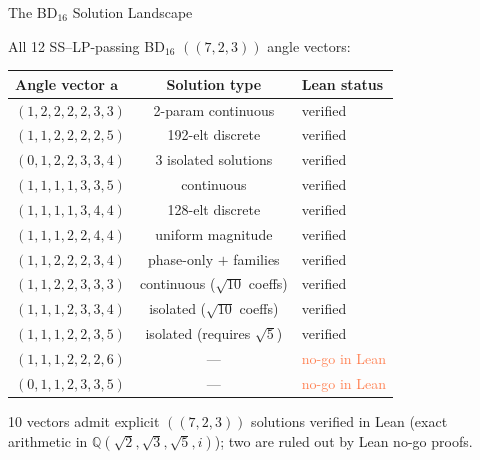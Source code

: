 \documentclass[aspectratio=169,t,10pt]{beamer}
\newcommand{\QQ}{\mathbb{Q}}
\begin{document}
\begin{frame}{The BD$_{16}$ Solution Landscape}

All 12 SS--LP-passing BD$_{16}$ $((7,2,3))$ angle vectors:

\vspace{-0.5em}
\begin{center}
{\scriptsize
\begin{tabular}{@{}lcl@{}}
\toprule
\textbf{Angle vector $\mathbf{a}$} & \textbf{Solution type} & \textbf{Lean status} \\
\midrule
$(1,2,2,2,2,3,3)$ & 2-param continuous & \textcolor{Sage}{verified} \\
$(1,1,2,2,2,2,5)$ & 192-elt discrete & \textcolor{Sage}{verified} \\
$(0,1,2,2,3,3,4)$ & 3 isolated solutions & \textcolor{Sage}{verified} \\
$(1,1,1,1,3,3,5)$ & continuous & \textcolor{Sage}{verified} \\
$(1,1,1,1,3,4,4)$ & 128-elt discrete & \textcolor{Sage}{verified} \\
$(1,1,1,2,2,4,4)$ & uniform magnitude & \textcolor{Sage}{verified} \\
$(1,1,2,2,2,3,4)$ & phase-only $+$ families & \textcolor{Sage}{verified} \\
$(1,1,2,2,3,3,3)$ & continuous ($\sqrt{10}$ coeffs) & \textcolor{Sage}{verified} \\
$(1,1,1,2,3,3,4)$ & isolated ($\sqrt{10}$ coeffs) & \textcolor{Sage}{verified} \\
$(1,1,1,2,2,3,5)$ & isolated (requires $\sqrt{5}$) & \textcolor{Sage}{verified} \\
\rowcolor{Coral!8}
$(1,1,1,2,2,2,6)$ & --- & \textcolor{Coral}{no-go in Lean} \\
\rowcolor{Coral!8}
$(0,1,1,2,3,3,5)$ & --- & \textcolor{Coral}{no-go in Lean} \\
\bottomrule
\end{tabular}
}
\end{center}

\vspace{-0.7em}
\textcolor{Slate}{\scriptsize 10 vectors admit explicit $((7,2,3))$ solutions verified in Lean (exact arithmetic in $\QQ(\sqrt{2},\sqrt{3},\sqrt{5},i)$); two are ruled out by Lean no-go proofs.}
\end{frame}
\end{document}
